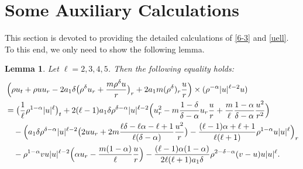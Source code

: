 \documentclass[11pt,reqno]{amsart}
\newtheorem{lem}{Lemma}[section]
\numberwithin{rk}{section}
\numberwithin{prop}{section}
\numberwithin{mydef}{section}
\numberwithin{lem}{section}
\numberwithin{equation}{section}
\numberwithin{thm}{section}
\begin{document}
\section{Some Auxiliary Calculations}\label{appd}
This section is devoted to providing the detailed calculations of \eqref{6-3} and \eqref{uell}. To this end, we only need to show the following lemma.
\begin{lem}
Let $\ell=2,3,4,5$. Then the following equality holds{\rm:}
\begin{align*}
&\,\Big(\rho u_t+\rho uu_r-2a_1\delta \big(\rho^\delta u_r+\frac{m\rho^\delta u}{r}\big)_r+2a_1m(\rho^\delta)_r\frac{u}{r}\Big)\times (\rho^{-\alpha}|u|^{\ell-2}u)\\
&=\big(\frac{1}{\ell}\rho^{1-\alpha}|u|^\ell\big)_t+2(\ell-1)a_1\delta\rho^{\delta-\alpha}|u|^{\ell-2}\Big(u_r^2-m\frac{1-\delta}{\delta-\alpha}u_r\frac{u}{r}+\frac{m}{\ell}\frac{1-\alpha}{\delta-\alpha}\frac{u^2}{r^2}\Big)\notag\\
&\quad -\Big(a_1\delta\rho^{\delta-\alpha}|u|^{\ell-2}\big(2uu_r+2m\frac{\ell\delta-\ell\alpha- \ell+1}{\ell(\delta-\alpha)}\frac{u^{2}}{r}\big) -\frac{(\ell-1)\alpha+\ell+1}{\ell(\ell+1)}\rho^{1-\alpha}u|u|^\ell\Big)_r\\
&\quad -\rho^{1-\alpha}vu|u|^{\ell-2}\Big(\alpha u_r-\frac{m(1-\alpha)}{\ell}\frac{u}{r}\Big)-\frac{(\ell-1)\alpha(1-\alpha)}{2\ell(\ell+1)a_1\delta}\rho^{2-\delta-\alpha}(v-u)u|u|^{\ell}.
\end{align*}
\end{lem}
\end{document}

